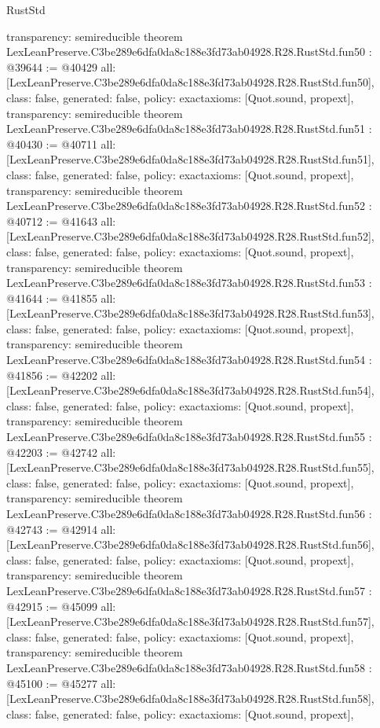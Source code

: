\begin{lexlean}{RustStd}
\begin{coremodule}
{  transparency: semireducible
}
theorem LexLeanPreserve.C3be289e6dfa0da8c188e3fd73ab04928.R28.RustStd.fun50 : @39644 := @40429 {
  all: [LexLeanPreserve.C3be289e6dfa0da8c188e3fd73ab04928.R28.RustStd.fun50],
  class: false,
  generated: false,
  policy: exact{axioms: [Quot.sound, propext]},
  transparency: semireducible
}
theorem LexLeanPreserve.C3be289e6dfa0da8c188e3fd73ab04928.R28.RustStd.fun51 : @40430 := @40711 {
  all: [LexLeanPreserve.C3be289e6dfa0da8c188e3fd73ab04928.R28.RustStd.fun51],
  class: false,
  generated: false,
  policy: exact{axioms: [Quot.sound, propext]},
  transparency: semireducible
}
theorem LexLeanPreserve.C3be289e6dfa0da8c188e3fd73ab04928.R28.RustStd.fun52 : @40712 := @41643 {
  all: [LexLeanPreserve.C3be289e6dfa0da8c188e3fd73ab04928.R28.RustStd.fun52],
  class: false,
  generated: false,
  policy: exact{axioms: [Quot.sound, propext]},
  transparency: semireducible
}
theorem LexLeanPreserve.C3be289e6dfa0da8c188e3fd73ab04928.R28.RustStd.fun53 : @41644 := @41855 {
  all: [LexLeanPreserve.C3be289e6dfa0da8c188e3fd73ab04928.R28.RustStd.fun53],
  class: false,
  generated: false,
  policy: exact{axioms: [Quot.sound, propext]},
  transparency: semireducible
}
theorem LexLeanPreserve.C3be289e6dfa0da8c188e3fd73ab04928.R28.RustStd.fun54 : @41856 := @42202 {
  all: [LexLeanPreserve.C3be289e6dfa0da8c188e3fd73ab04928.R28.RustStd.fun54],
  class: false,
  generated: false,
  policy: exact{axioms: [Quot.sound, propext]},
  transparency: semireducible
}
theorem LexLeanPreserve.C3be289e6dfa0da8c188e3fd73ab04928.R28.RustStd.fun55 : @42203 := @42742 {
  all: [LexLeanPreserve.C3be289e6dfa0da8c188e3fd73ab04928.R28.RustStd.fun55],
  class: false,
  generated: false,
  policy: exact{axioms: [Quot.sound, propext]},
  transparency: semireducible
}
theorem LexLeanPreserve.C3be289e6dfa0da8c188e3fd73ab04928.R28.RustStd.fun56 : @42743 := @42914 {
  all: [LexLeanPreserve.C3be289e6dfa0da8c188e3fd73ab04928.R28.RustStd.fun56],
  class: false,
  generated: false,
  policy: exact{axioms: [Quot.sound, propext]},
  transparency: semireducible
}
theorem LexLeanPreserve.C3be289e6dfa0da8c188e3fd73ab04928.R28.RustStd.fun57 : @42915 := @45099 {
  all: [LexLeanPreserve.C3be289e6dfa0da8c188e3fd73ab04928.R28.RustStd.fun57],
  class: false,
  generated: false,
  policy: exact{axioms: [Quot.sound, propext]},
  transparency: semireducible
}
theorem LexLeanPreserve.C3be289e6dfa0da8c188e3fd73ab04928.R28.RustStd.fun58 : @45100 := @45277 {
  all: [LexLeanPreserve.C3be289e6dfa0da8c188e3fd73ab04928.R28.RustStd.fun58],
  class: false,
  generated: false,
  policy: exact{axioms: [Quot.sound, propext]},
}
\end{coremodule}
\end{lexlean}
